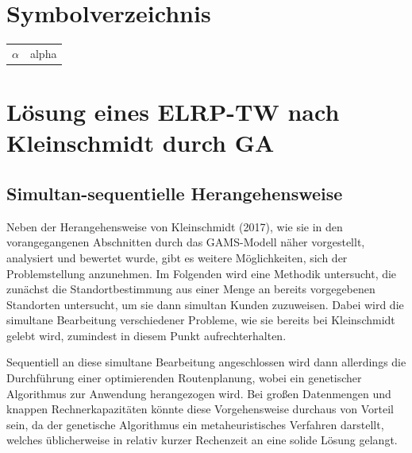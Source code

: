 \documentclass[a4paper,12pt,parskip,bibtotoc,liststotoc]{article}
\begin{document}
\section*{Symbolverzeichnis}
\begin{table}[h!]
    \vspace*{-3mm}
    \hspace*{2mm}
  \renewcommand{\arraystretch}{1,5}
    \begin{tabular}{ll}  %
     $\alpha$	& alpha\\     %
	\end{tabular}
\end{table}

\newpage




\section{Lösung eines ELRP-TW nach Kleinschmidt durch GA}


\subsection{Simultan-sequentielle Herangehensweise}

Neben der Herangehensweise von Kleinschmidt (2017), wie sie in den vorangegangenen Abschnitten durch das GAMS-Modell näher vorgestellt, analysiert und bewertet wurde, gibt es weitere Möglichkeiten, sich der Problemstellung anzunehmen.
Im Folgenden wird eine Methodik untersucht, die zunächst die Standortbestimmung aus einer Menge an bereits vorgegebenen Standorten untersucht, um sie dann simultan Kunden zuzuweisen.
Dabei wird die simultane Bearbeitung verschiedener Probleme, wie sie bereits bei Kleinschmidt gelebt wird, zumindest in diesem Punkt aufrechterhalten.

Sequentiell an diese simultane Bearbeitung angeschlossen wird dann allerdings die Durchführung einer optimierenden Routenplanung, wobei ein genetischer Algorithmus zur Anwendung herangezogen wird.
Bei großen Datenmengen und knappen Rechnerkapazitäten könnte diese Vorgehensweise durchaus von Vorteil sein, da der genetische Algorithmus ein metaheuristisches Verfahren darstellt, welches üblicherweise in relativ kurzer Rechenzeit an eine solide Lösung gelangt.
\end{document}
